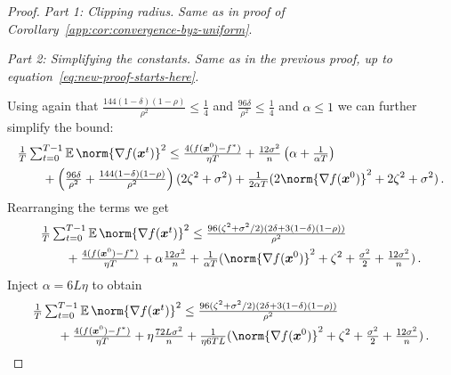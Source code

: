 \documentclass{article}
\begin{document}
\begin{proof}
   \textit{Part 1: Clipping radius.} \textit{Same as in proof of Corollary~\ref{app:cor:convergence-byz-uniform}}.
  
  
  \textit{Part 2: Simplifying the constants.} \textit{Same as in the previous proof, up to equation~\ref{eq:new-proof-starts-here}.} 
  
  Using again that $\tfrac{144(1-\delta)(1-\rho)}{\rho^2} \le \tfrac{1}{4}$ and $\tfrac{96\delta}{\rho^2} \le \tfrac{1}{4}$ and $\alpha \le 1$ we can further simplify the bound:
  \begin{align*}
    & \tfrac{1}{T} \tsum_{t=0}^{T-1} \E \norm{\nabla f(\xx^t)}^2 
    \le  
    \tfrac{4(f(\xx^0) - f^\ast)}{\eta T}
     +
    \tfrac{12\sigma^2}{n} \left(\alpha + \tfrac{1}{\alpha T}\right)
    \\
     & \qquad + 
    \left( \tfrac{96 \delta}{\rho^2} + \tfrac{144(1-\delta)(1-\rho)}{\rho^2} \right) (2\zeta^2 + \sigma^2)
      + \tfrac{1}{2\alpha T}(
        2\norm{\nabla f(\xx^0) }^2
        + 2 \zeta^2
        + \sigma^2
      )
    \, .
  \end{align*}
  Rearranging the terms we get
  \begin{align*}
    & \tfrac{1}{T} \tsum_{t=0}^{T-1} \E \norm{\nabla f(\xx^t)}^2 
    \le  
    \tfrac{96(\zeta^2 + \sigma^2/2)(2 \delta + 3(1-\delta)(1-\rho))}{\rho^2} 
    \\
     & \qquad + 
    \tfrac{4(f(\xx^0) - f^\ast)}{\eta T}
    +
    \alpha \tfrac{12\sigma^2}{n}
    + 
    \tfrac{1}{\alpha T}
    (
      \norm{\nabla f(\xx^0) }^2
      + \zeta^2
      + \tfrac{\sigma^2}{2} + \tfrac{12\sigma^2}{n}
    )
    \, .
  \end{align*}
  Inject $\alpha = 6L\eta$ to obtain
  \begin{align*}
    & \tfrac{1}{T} \tsum_{t=0}^{T-1} \E \norm{\nabla f(\xx^t)}^2 
    \le  
    \tfrac{96(\zeta^2 + \sigma^2/2)(2 \delta + 3(1-\delta)(1-\rho))}{\rho^2} 
    \\
     & \qquad + 
    \tfrac{4(f(\xx^0) - f^\ast)}{\eta T}
    +
    \eta \tfrac{72 L \sigma^2}{n}
    + 
    \tfrac{1}{\eta 6 T L}
    (
      \norm{\nabla f(\xx^0) }^2
      + \zeta^2
      + \tfrac{\sigma^2}{2} + \tfrac{12\sigma^2}{n}
    )
    \, .
  \end{align*}
  

\end{proof}
\end{document}
